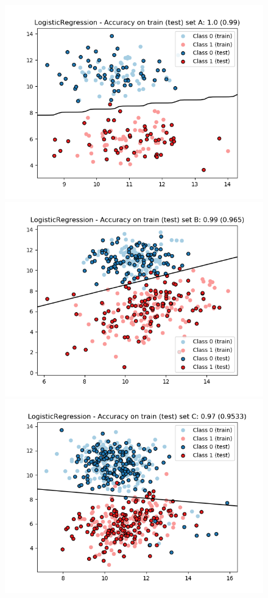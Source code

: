 \documentclass[a4paper, 11pt]{article}
\begin{document}
\begin{enumerate}[label=\alph*]
        \begin{figure}[!htb]
          \includegraphics[width=\linewidth]{./images/LogReg_A.png}
          \label{fig:logreg_a}
        \endminipage\hfill
          \includegraphics[width=\linewidth]{./images/LogReg_B.png}
          \label{fig:logreg_b}
        \endminipage\hfill
          \includegraphics[width=\linewidth]{./images/LogReg_C.png}

\end{figure}
\end{enumerate}
\end{document}
